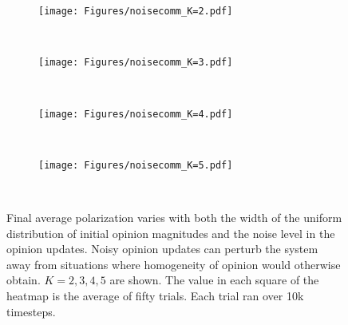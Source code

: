 \begin{figure}[t!]
  \centering
      \begin{subfigure}[t]{0.49\textwidth}
          \centering
          \texttt{[image: Figures/noisecomm\_K=2.pdf]}
          \caption{}
      \end{subfigure}
      ~
      \begin{subfigure}[t]{0.49\textwidth}
          \centering
          \texttt{[image: Figures/noisecomm\_K=3.pdf]}
          \caption{}
      \end{subfigure} \\
      \begin{subfigure}[t]{0.49\textwidth}
          \centering
          \texttt{[image: Figures/noisecomm\_K=4.pdf]}
          \caption{}
      \end{subfigure}
      ~
      \begin{subfigure}[t]{0.49\textwidth}
          \centering
          \texttt{[image: Figures/noisecomm\_K=5.pdf]}
          \caption{}
      \end{subfigure} \\
  \caption{Final average polarization varies with both the width of the
    uniform distribution of initial opinion magnitudes and the noise level in
    the opinion updates. Noisy opinion updates can perturb the system away from
    situations where homogeneity of opinion would otherwise obtain. $K=2,3,4,5$
    are shown. The value in each square of the heatmap is the average of
    fifty trials. Each trial ran over 10k timesteps.
  }
  \label{fig:heatmaps}
\end{figure}


